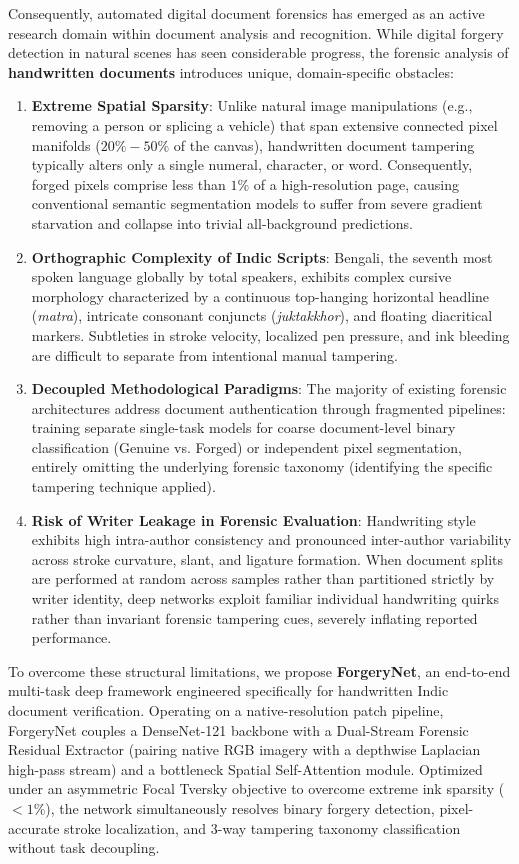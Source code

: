 \documentclass[pdflatex,sn-mathphys-num,iicol]{sn-jnl}
\begin{document}
Consequently, automated digital document forensics has emerged as an active research domain within document analysis and recognition. While digital forgery detection in natural scenes has seen considerable progress, the forensic analysis of \textbf{handwritten documents} introduces unique, domain-specific obstacles:
\begin{enumerate}[1.]
    \item \textbf{Extreme Spatial Sparsity}: Unlike natural image manipulations (e.g., removing a person or splicing a vehicle) that span extensive connected pixel manifolds ($20\%-50\%$ of the canvas), handwritten document tampering typically alters only a single numeral, character, or word. Consequently, forged pixels comprise less than $1\%$ of a high-resolution page, causing conventional semantic segmentation models to suffer from severe gradient starvation and collapse into trivial all-background predictions.
    \item \textbf{Orthographic Complexity of Indic Scripts}: Bengali, the seventh most spoken language globally by total speakers, exhibits complex cursive morphology characterized by a continuous top-hanging horizontal headline (\textit{matra}), intricate consonant conjuncts (\textit{juktakkhor}), and floating diacritical markers. Subtleties in stroke velocity, localized pen pressure, and ink bleeding are difficult to separate from intentional manual tampering.
    \item \textbf{Decoupled Methodological Paradigms}: The majority of existing forensic architectures address document authentication through fragmented pipelines: training separate single-task models for coarse document-level binary classification (Genuine vs. Forged) or independent pixel segmentation, entirely omitting the underlying forensic taxonomy (identifying the specific tampering technique applied).
    \item \textbf{Risk of Writer Leakage in Forensic Evaluation}: Handwriting style exhibits high intra-author consistency and pronounced inter-author variability across stroke curvature, slant, and ligature formation. When document splits are performed at random across samples rather than partitioned strictly by writer identity, deep networks exploit familiar individual handwriting quirks rather than invariant forensic tampering cues, severely inflating reported performance.
\end{enumerate}

To overcome these structural limitations, we propose \textbf{ForgeryNet}, an end-to-end multi-task deep framework engineered specifically for handwritten Indic document verification. Operating on a native-resolution patch pipeline, ForgeryNet couples a DenseNet-121 backbone with a Dual-Stream Forensic Residual Extractor (pairing native RGB imagery with a depthwise Laplacian high-pass stream) and a bottleneck Spatial Self-Attention module. Optimized under an asymmetric Focal Tversky objective to overcome extreme ink sparsity ($<1\%$), the network simultaneously resolves binary forgery detection, pixel-accurate stroke localization, and 3-way tampering taxonomy classification without task decoupling.
\end{document}
